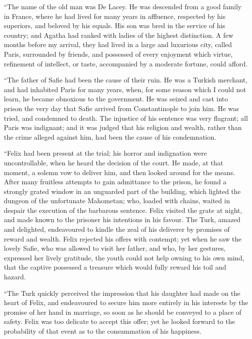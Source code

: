 ``The name of the old man was De
Lacey. He was descended from a good
family in France, where he had lived
for many years in affluence, respected
by his superiors, and beloved by his
equals. His son was bred in the service
of his country; and Agatha had
ranked with ladies of the highest distinction.
A few months before my
arrival, they had lived in a large and
luxurious city, called Paris, surrounded
by friends, and possessed of every enjoyment
which virtue, refinement of
intellect, or taste, accompanied by a
moderate fortune, could afford.

``The father of Safie had been the
cause of their ruin. He was a Turkish
merchant, and had inhabited Paris for
many years, when, for some reason
which I could not learn, he became
obnoxious to the government. He was
seized and cast into prison the very day
that Safie arrived from Constantinople
to join him. He was tried, and condemned
to death. The injustice of his
sentence was very flagrant; all Paris
was indignant; and it was judged that
his religion and wealth, rather than the
crime alleged against him, had been
the cause of his condemnation.

``Felix had been present at the trial;
his horror and indignation were uncontrollable,
when he heard the decision of
the court. He made, at that moment,
a solemn vow to deliver him, and then
looked around for the means. After
many fruitless attempts to gain admittance
to the prison, he found a strongly
grated window in an unguarded part
of the building, which lighted the dungeon
of the unfortunate Mahometan;
who, loaded with chains, waited in despair
the execution of the barbarous
sentence. Felix visited the grate at
night, and made known to the prisoner
his intentions in his favour. The Turk,
amazed and delighted, endeavoured to
kindle the zeal of his deliverer by promises
of reward and wealth. Felix
rejected his offers with contempt; yet
when he saw the lovely Safie, who was
allowed to visit her father, and who, by
her gestures, expressed her lively gratitude,
the youth could not help owning
to his own mind, that the captive
possessed a treasure which would fully
reward his toil and hazard.

``The Turk quickly perceived the
impression that his daughter had made
on the heart of Felix, and endeavoured
to secure him more entirely in his interests
by the promise of her hand in
marriage, so soon as he should be conveyed
to a place of safety. Felix was
too delicate to accept this offer; yet he
looked forward to the probability of
that event as to the consummation of
his happiness.

